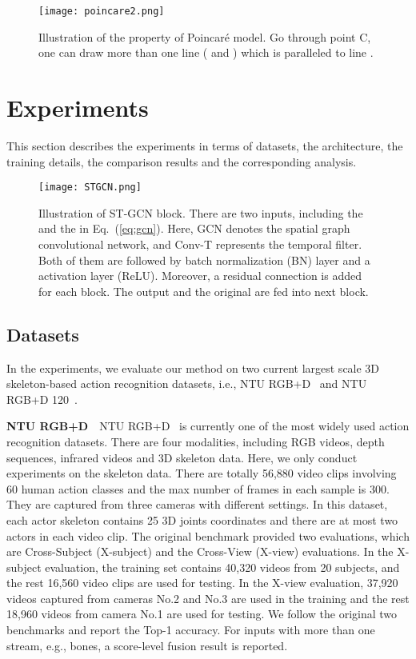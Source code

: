 \documentclass[letterpaper]{article} \usepackage{aaai19}  \usepackage{times}  \usepackage{helvet} \usepackage{courier}  \usepackage[hyphens]{url}  \usepackage{graphicx} \urlstyle{rm} \def\UrlFont{\rm}  \usepackage{graphicx}  \frenchspacing  \setlength{\pdfpagewidth}{8.5in}  \setlength{\pdfpageheight}{11in}
\begin{document}
\begin{figure}
    \centering
    \texttt{[image: poincare2.png]}
    \caption{Illustration of the property of Poincar\'e model. Go through point C, one can draw more than one line ( and ) which is paralleled to line .}
    \label{fig:poincare2}
    \vspace{-2em}
\end{figure}


\section{Experiments}\label{sec:exp}
This section describes the experiments in terms of datasets, the architecture, the training details, the comparison results and the corresponding analysis.

\begin{figure}
    \centering
    \texttt{[image: STGCN.png]}
    \caption{ Illustration of ST-GCN block. There are two inputs, including the  and the  in Eq.~(\ref{eq:gcn}). Here, GCN denotes the spatial graph convolutional network, and Conv-T represents the temporal filter. Both of them are followed by batch normalization (BN) layer and a activation layer (ReLU). Moreover, a residual connection is added for each block. The output and the original  are fed into next block.}
    \label{fig:stgcn}
\end{figure}
\subsection{Datasets}
In the experiments, we evaluate our method on two current largest scale 3D skeleton-based action recognition datasets, i.e., NTU RGB+D~\cite{shahroudy2016ntu} and NTU RGB+D 120~\cite{liu2019ntu}.

\textbf{NTU RGB+D}~~NTU RGB+D~\cite{shahroudy2016ntu} is currently one of the most widely used action recognition datasets. There are four modalities, including RGB videos, depth sequences, infrared videos and 3D skeleton data. Here, we only conduct experiments on the skeleton data. There are totally 56,880 video clips involving 60 human action classes and the max number of frames in each sample is 300. They are captured from three cameras with different settings. In this dataset, each actor skeleton contains 25 3D joints coordinates and there are at most two actors in each video clip. The original benchmark provided two evaluations, which are Cross-Subject (X-subject) and the Cross-View (X-view) evaluations. In the X-subject evaluation, the training set contains 40,320 videos from 20 subjects, and the rest 16,560 video clips are used for testing. In the X-view evaluation, 37,920 videos captured from cameras No.2 and No.3 are used in the training and the rest 18,960 videos from camera No.1 are used for testing. We follow the original two benchmarks and report the Top-1 accuracy. For inputs with more than one stream, e.g., bones, a score-level fusion result is reported.
\end{document}
